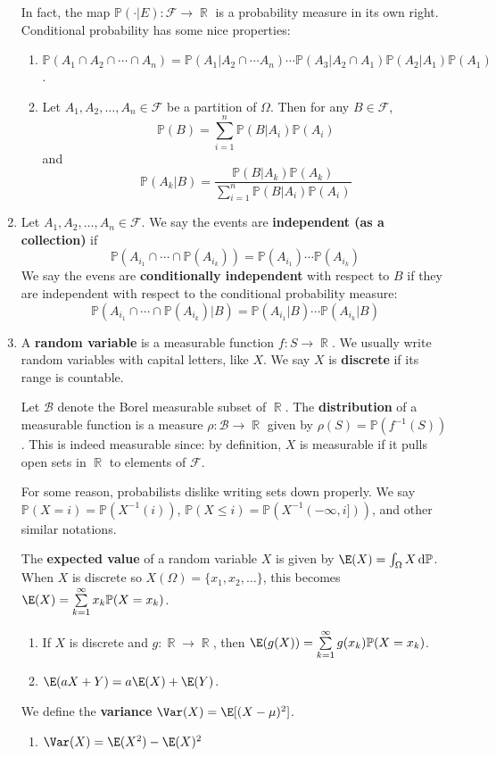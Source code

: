 \documentclass[12pt, a4paper]{article}
\DeclareMathOperator{\R}{\mathbb{R}}
\renewcommand{\Pr}{\mathbb{P}}
\renewcommand{\d}[1]{\ensuremath{\operatorname{d}\!{#1}}} %
\theoremstyle{nonumberplain}
\begin{document}
\begin{enumerate}
        In fact, the map $\Pr(\cdot|E):\mathcal{F}\to\R$ is a probability measure in its own right.
        Conditional probability has some nice properties:
        \begin{enumerate}
            \item $\Pr(A_1\cap A_2\cap\cdots\cap A_n)=\Pr(A_1|A_2\cap\cdots A_n)\cdots\Pr(A_3|A_2\cap A_1)\Pr(A_2|A_1)\Pr(A_1)$.
            \item Let $A_1,A_2,\ldots,A_n\in\mathcal{F}$ be a partition of $\Omega$.
                Then for any $B\in\mathcal{F}$,
                \[\Pr(B)=\sum\limits_{i=1}^n\Pr(B|A_i)\Pr(A_i)\]
                and
                \[\Pr(A_k|B)=\frac{\Pr(B|A_k)\Pr(A_k)}{\sum\limits_{i=1}^n\Pr(B|A_i)\Pr(A_i)}\]
        \end{enumerate}
    \item Let $A_1,A_2,\ldots,A_n\in\mathcal{F}$.
        We say the events are \textbf{independent (as a collection)} if
        \[\Pr(A_{i_1}\cap\cdots\cap\Pr(A_{i_k}))=\Pr(A_{i_1})\cdots\Pr(A_{i_k})\]
        We say the evens are \textbf{conditionally independent} with respect to $B$ if they are independent with respect to the conditional probability measure:
        \[\Pr(A_{i_1}\cap\cdots\cap\Pr(A_{i_k})|B)=\Pr(A_{i_1}|B)\cdots\Pr(A_{i_k}|B)\]
    \item A \textbf{random variable} is a measurable function $f:S\to\R$.
        We usually write random variables with capital letters, like $X$.
        We say $X$ is \textbf{discrete} if its range is countable.

        Let $\mathcal{B}$ denote the Borel measurable subset of $\R$.
        The \textbf{distribution} of a measurable function is a measure $\rho:\mathcal{B}\to\R$ given by $\rho(S)=\Pr(f^{-1}(S))$.
        This is indeed measurable since: by definition, $X$ is measurable if it pulls open sets in $\R$ to elements of $\mathcal{F}$.

        For some reason, probabilists dislike writing sets down properly.
        We say $\Pr(X=i)=\Pr(X^{-1}(i))$, $\Pr(X\leq i)=\Pr(X^{-1}(-\infty,i]))$, and other similar notations.

        The \textbf{expected value} of a random variable $X$ is given by $\E(X)=\int_\Omega X\d{\Pr}$.
        When $X$ is discrete so $X(\Omega)=\{x_1,x_2,\ldots\}$, this becomes $\E(X)=\sum\limits_{k=1}^\infty x_k\Pr(X=x_k)$.
        \begin{enumerate}
            \item If $X$ is discrete and $g:\R\to\R$, then $\E(g(X))=\sum\limits_{k=1}^\infty g(x_k)\Pr(X=x_k)$.
            \item $\E(aX+Y)=a\E(X)+\E(Y)$.
        \end{enumerate}
        We define the \textbf{variance} $\Var(X)=\E[(X-\mu)^2]$.
        \begin{enumerate}
            \item $\Var(X)=\E(X^2)-\E(X)^2$
        \end{enumerate}
\end{enumerate}
\end{document}
